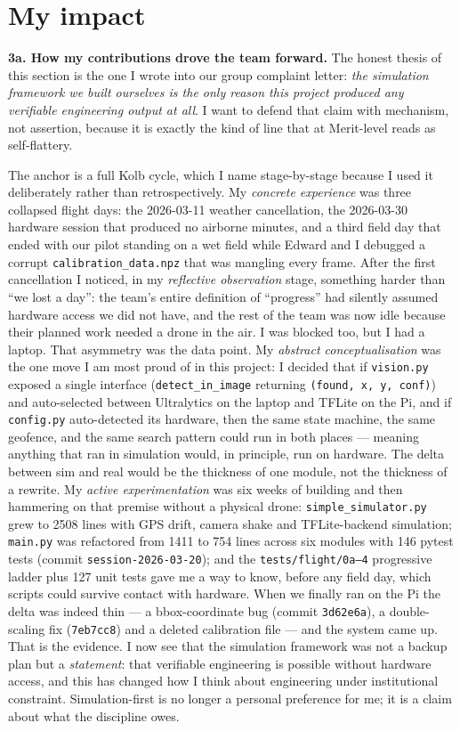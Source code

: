 \section{My impact}

\textbf{3a. How my contributions drove the team forward.} The honest thesis of this section is the one I wrote into our group complaint letter: \emph{the simulation framework we built ourselves is the only reason this project produced any verifiable engineering output at all}. I want to defend that claim with mechanism, not assertion, because it is exactly the kind of line that at Merit-level reads as self-flattery.

The anchor is a full Kolb cycle, which I name stage-by-stage because I used it deliberately rather than retrospectively. My \emph{concrete experience} was three collapsed flight days: the 2026-03-11 weather cancellation, the 2026-03-30 hardware session that produced no airborne minutes, and a third field day that ended with our pilot standing on a wet field while Edward and I debugged a corrupt \texttt{calibration\_data.npz} that was mangling every frame. After the first cancellation I noticed, in my \emph{reflective observation} stage, something harder than ``we lost a day'': the team's entire definition of ``progress'' had silently assumed hardware access we did not have, and the rest of the team was now idle because their planned work needed a drone in the air. I was blocked too, but I had a laptop. That asymmetry was the data point. My \emph{abstract conceptualisation} was the one move I am most proud of in this project: I decided that if \texttt{vision.py} exposed a single interface (\texttt{detect\_in\_image} returning \texttt{(found, x, y, conf)}) and auto-selected between Ultralytics on the laptop and TFLite on the Pi, and if \texttt{config.py} auto-detected its hardware, then the same state machine, the same geofence, and the same search pattern could run in both places --- meaning anything that ran in simulation would, in principle, run on hardware. The delta between sim and real would be the thickness of one module, not the thickness of a rewrite. My \emph{active experimentation} was six weeks of building and then hammering on that premise without a physical drone: \texttt{simple\_simulator.py} grew to 2508 lines with GPS drift, camera shake and TFLite-backend simulation; \texttt{main.py} was refactored from 1411 to 754 lines across six modules with 146 pytest tests (commit \texttt{session-2026-03-20}); and the \texttt{tests/flight/0a--4} progressive ladder plus 127 unit tests gave me a way to know, before any field day, which scripts could survive contact with hardware. When we finally ran on the Pi the delta was indeed thin --- a bbox-coordinate bug (commit \texttt{3d62e6a}), a double-scaling fix (\texttt{7eb7cc8}) and a deleted calibration file --- and the system came up. That is the evidence. I now see that the simulation framework was not a backup plan but a \emph{statement}: that verifiable engineering is possible without hardware access, and this has changed how I think about engineering under institutional constraint. Simulation-first is no longer a personal preference for me; it is a claim about what the discipline owes.

